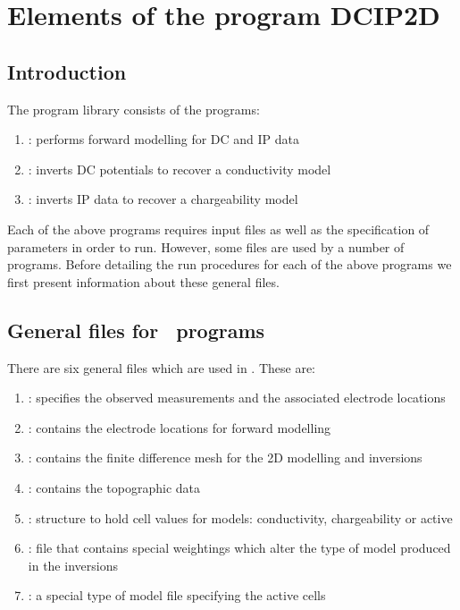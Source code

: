 \section{Elements of the program DCIP2D}
\label{Elements}

\subsection{Introduction}

The \codeName{\prog} program library consists of the programs:
\begin{enumerate}
\item {}: performs forward modelling for DC and IP data 
\item {}: inverts DC potentials to recover a conductivity model 
\item {}: inverts IP data to recover a chargeability model 
\end{enumerate}

Each of the above programs requires input files as well as the specification of parameters in order to run. However, some files are used by a number of programs. Before detailing the run procedures for each of the above programs we first present information about these general files. 

\subsection{General files for \prog~programs}

There are six general files which are used in \prog. These are: 

\begin{enumerate}
\item {}: specifies the observed measurements and the associated electrode locations
\item {}: contains the electrode locations for forward modelling
\item {}: contains the finite difference mesh for the 2D modelling and inversions 
\item {}: contains the topographic data 
\item {}: structure to hold cell values for models: conductivity, chargeability or active
\item {}: file that contains special weightings which alter the type of model produced in the inversions
\item {}: a special type of model file specifying the active cells
\end{enumerate}











